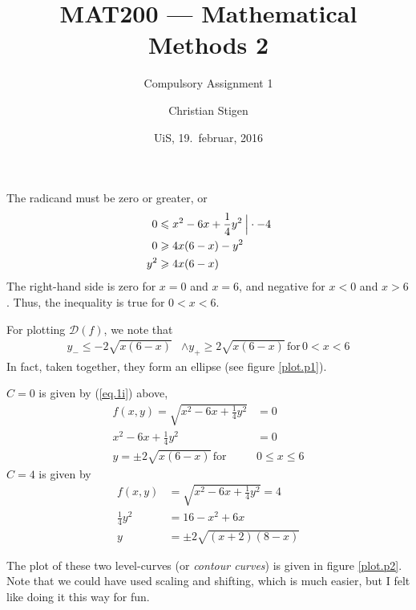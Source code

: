 \documentclass[a4paper,norsk,12pt]{article}
\title{MAT200 --- Mathematical Methods 2}
\subtitle{Compulsory Assignment 1}
\author{Christian Stigen}
\date{UiS, 19.~februar, 2016}
\begin{document}
\maketitle

\label{problem.1}

The radicand must be zero or greater, or
\begin{align*}
  0 & \leqslant x^2-6x+\frac{1}{4}y^2 \> \Big{|} \cdot-4 \\
  0 & \geqslant 4x(6-x)-y^2 \\
  y^2 & \geqslant 4x(6-x)
\end{align*}
The right-hand side is zero for $x=0$ and $x=6$, and negative for $x<0$
and $x>6$. Thus, the inequality is true for $0 < x < 6$.

For plotting $\mathcal{D}(f)$, we note that
  \begin{align}
    y_{-} \leqslant -2\sqrt{x(6-x)} & \wedge y_{+} \geqslant 2\sqrt{x(6-x)}
    \,\text{for}\, 0<x<6 \label{eq.1i}
  \end{align}
In fact, taken together, they form an ellipse (see figure \vref{plot.p1}).


$C=0$ is given by (\ref{eq.1i}) above,
\begin{align*}
  f(x,y) = \sqrt{x^2 - 6x + \frac{1}{4}y^2} &= 0\\
  x^2 - 6x + \frac{1}{4}y^2 &= 0\\
  y = \pm2\sqrt{x(6-x)} \, \text{for} \, &0 \leqslant x \leqslant 6
\end{align*}
$C=4$ is given by
\begin{align*}
  f(x,y) &= \sqrt{x^2 - 6x + \frac{1}{4}y^2} = 4\\
  \frac{1}{4}y^2 &= 16 - x^2 + 6x\\
  y &= \pm2\sqrt{(x+2)(8-x)}
\end{align*}

The plot of these two level-curves (or \textit{contour curves}) is given in
figure \vref{plot.p2}. Note that we could have used scaling and shifting, which
is much easier, but I felt like doing it this way for fun.
\end{document}
